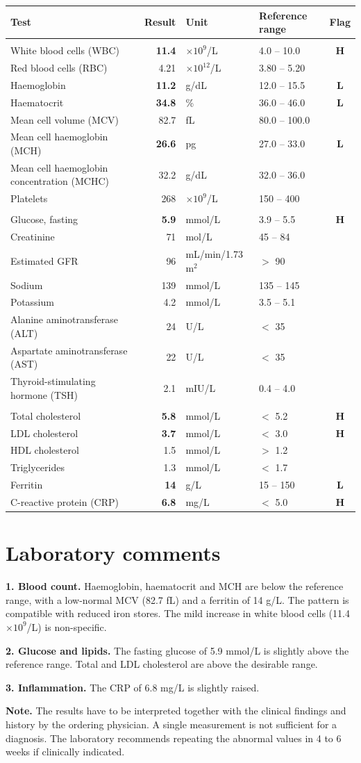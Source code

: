 \documentclass[9.5pt,a4paper]{extarticle}
\makeatletter
\newcommand{\ok}[5]{#1 & #2 & #3 & #4 & #5 \\}
\newcommand{\flagged}[5]{\rowcolor{flagbg}#1 & \textbf{#2} & #3 & #4 & \textbf{#5} \\}
\newcommand{\panel}[1]{\midrule\rowcolor{lab!10}\multicolumn{5}{@{}l}{\textbf{\color{lab}#1}} \\\midrule}
\makeatother
\begin{document}
\begin{center}
\small
\begin{tabularx}{\linewidth}{@{}>{\raggedright\arraybackslash}X r l l c@{}}
  \toprule
  \textbf{Test} & \textbf{Result} & \textbf{Unit} & \textbf{Reference range} & \textbf{Flag} \\
  \panel{Complete blood count}
  \flagged{White blood cells (WBC)}{11.4}{$\times 10^{9}$/L}{4.0 -- 10.0}{H}
  \ok{Red blood cells (RBC)}{4.21}{$\times 10^{12}$/L}{3.80 -- 5.20}{}
  \flagged{Haemoglobin}{11.2}{g/dL}{12.0 -- 15.5}{L}
  \flagged{Haematocrit}{34.8}{\%}{36.0 -- 46.0}{L}
  \ok{Mean cell volume (MCV)}{82.7}{fL}{80.0 -- 100.0}{}
  \flagged{Mean cell haemoglobin (MCH)}{26.6}{pg}{27.0 -- 33.0}{L}
  \ok{Mean cell haemoglobin concentration (MCHC)}{32.2}{g/dL}{32.0 -- 36.0}{}
  \ok{Platelets}{268}{$\times 10^{9}$/L}{150 -- 400}{}
  \panel{Clinical chemistry}
  \flagged{Glucose, fasting}{5.9}{mmol/L}{3.9 -- 5.5}{H}
  \ok{Creatinine}{71}{\textmu mol/L}{45 -- 84}{}
  \ok{Estimated GFR}{96}{mL/min/1.73 m$^{2}$}{$>$ 90}{}
  \ok{Sodium}{139}{mmol/L}{135 -- 145}{}
  \ok{Potassium}{4.2}{mmol/L}{3.5 -- 5.1}{}
  \ok{Alanine aminotransferase (ALT)}{24}{U/L}{$<$ 35}{}
  \ok{Aspartate aminotransferase (AST)}{22}{U/L}{$<$ 35}{}
  \ok{Thyroid-stimulating hormone (TSH)}{2.1}{mIU/L}{0.4 -- 4.0}{}
  \panel{Lipids, iron stores and inflammation}
  \flagged{Total cholesterol}{5.8}{mmol/L}{$<$ 5.2}{H}
  \flagged{LDL cholesterol}{3.7}{mmol/L}{$<$ 3.0}{H}
  \ok{HDL cholesterol}{1.5}{mmol/L}{$>$ 1.2}{}
  \ok{Triglycerides}{1.3}{mmol/L}{$<$ 1.7}{}
  \flagged{Ferritin}{14}{\textmu g/L}{15 -- 150}{L}
  \flagged{C-reactive protein (CRP)}{6.8}{mg/L}{$<$ 5.0}{H}
  \bottomrule
\end{tabularx}
\end{center}

\section*{\normalsize\color{lab} Laboratory comments}
\begin{tcolorbox}[colback=lab!5, colframe=lab, boxrule=0.5pt, arc=2pt, left=8pt, right=8pt, top=5pt, bottom=5pt]
\small
\textbf{1. Blood count.} Haemoglobin, haematocrit and MCH are below the reference range, with a low-normal MCV
(82.7 fL) and a ferritin of 14 \textmu g/L. The pattern is compatible with reduced iron stores. The mild
increase in white blood cells (11.4 $\times 10^{9}$/L) is non-specific.

\textbf{2. Glucose and lipids.} The fasting glucose of 5.9 mmol/L is slightly above the reference range.
Total and LDL cholesterol are above the desirable range.

\textbf{3. Inflammation.} The CRP of 6.8 mg/L is slightly raised.

\textbf{Note.} The results have to be interpreted together with the clinical findings and history by the ordering
physician. A single measurement is not sufficient for a diagnosis. The laboratory recommends repeating the abnormal
values in 4 to 6 weeks if clinically indicated.
\end{tcolorbox}
\end{document}
